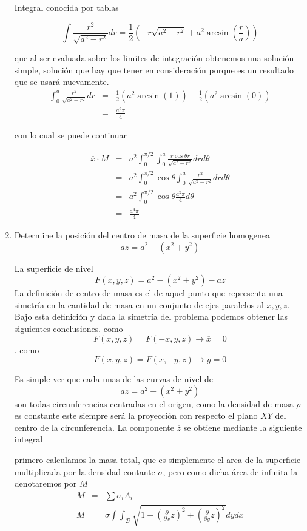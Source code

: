 \documentclass{article}
\begin{document}
\begin{enumerate}
Integral conocida por tablas

$$\int \frac{r^2 }{\sqrt{a^2-r^2}}dr = \frac{1}{2}\left(-r \sqrt{a^2-r^2}+a^2 \arcsin\left(\frac{r}{a}\right)\right)$$

que al ser evaluada sobre los limites de integración obtenemos una solución simple, solución que hay que tener en consideración porque es un resultado que se usará nuevamente.
\begin{eqnarray*}
\int_0^a \frac{r^2}{\sqrt{a^2-r^2}}dr &=& \frac{1}{2}\left(a^2 \arcsin\left(1\right)\right)-\frac{1}{2}\left(a^2 \arcsin\left(0\right)\right)\\
&=&\frac{a^2\pi}{4}
\end{eqnarray*}

con lo cual se puede continuar

\begin{eqnarray*}
\overline{x}\cdot M &=& a^2\int_0^{\pi/2}\int_0^{a} \frac{r\cos \theta r}{\sqrt{a^2-r^2}}drd\theta\\
&=& a^2\int_0^{\pi/2}\cos \theta \int_0^{a} \frac{r^2 }{\sqrt{a^2-r^2}}drd\theta\\
&=& a^2\int_0^{\pi/2}\cos \theta\frac{a^2\pi}{4}d\theta\\
&=&\frac{a^4\pi}{4}
\end{eqnarray*}

	
	\item Determine la posición del centro de masa de la superficie homogenea $$az = a^2-\left(x^2+y^2\right)$$ 
	
	
	La superficie de nivel $$F(x,y,z) = a^2-(x^2+y^2)-az$$
	La definición de centro de masa es el de aquel punto que representa una simetría en la cantidad de masa en un conjunto de ejes paralelos al $x,y,z$. Bajo esta definición y dada la simetría del problema podemos obtener las siguientes conclusiones.
	como $$F(x,y,z)=F(-x,y,z)\to \overline{x}=0$$.
	como $$F(x,y,z)=F(x,-y,z)\to \overline{y}=0$$
	
Es simple ver que cada unas de las curvas de nivel de $$az = a^2-\left(x^2+y^2\right)$$ son todas circunferencias centradas en el origen, como la densidad de masa $\rho$ es constante este siempre será la proyección con respecto el plano $XY$ del centro de la circunferencia.
	La componente $\overline{z}$ se obtiene mediante la siguiente integral
	
	primero calculamos la masa total, que es simplemente el area de la superficie multiplicada por la densidad contante $\sigma$, pero como dicha área de infinita la denotaremos por $M$ 
\begin{eqnarray*}
	M &=& \sum\sigma_i A_i\\
	M &=& \sigma\int \int _{\mathcal{D}} \sqrt{1+\left(\frac{\partial}{\partial x} z\right)^2+\left(\frac{\partial}{\partial y} z\right)^2}dydx	
\end{eqnarray*}	


\end{enumerate}
\end{document}
